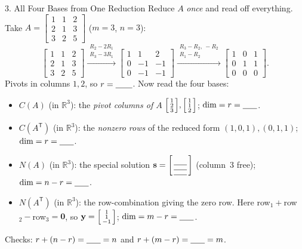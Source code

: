 \documentclass[10pt]{article}
\newcommand{\yy}{\mathbf{y}}
\newcommand{\svec}{\mathbf{s}}
\newcommand{\zero}{\mathbf{0}}
\newcommand{\T}{\mathsf{T}}
\begin{document}
\begin{notesbox}{3. All Four Bases from One Reduction}
Reduce $A$ \emph{once} and read off everything. Take
$A=\begin{bmatrix} 1 & 1 & 2 \\ 2 & 1 & 3 \\ 3 & 2 & 5 \end{bmatrix}$ ($m=3$, $n=3$):
\[
  \begin{bmatrix} 1 & 1 & 2 \\ 2 & 1 & 3 \\ 3 & 2 & 5 \end{bmatrix}
  \xrightarrow{\substack{R_2-2R_1\\ R_3-3R_1}}
  \begin{bmatrix} 1 & 1 & 2 \\ 0 & -1 & -1 \\ 0 & -1 & -1 \end{bmatrix}
  \xrightarrow{\substack{R_3-R_2,\ -R_2\\ R_1-R_2}}
  \begin{bmatrix} 1 & 0 & 1 \\ 0 & 1 & 1 \\ 0 & 0 & 0 \end{bmatrix}.
\]
Pivots in columns $1,2$, so $r=\blank{0.7cm}$. Now read the four bases:
\begin{itemize}\setlength{\itemsep}{2pt}
  \item \textbf{$C(A)$} (in $\mathbb{R}^3$): the \emph{pivot columns of $A$} $\begin{bsmallmatrix} 1\\2\\3 \end{bsmallmatrix},\begin{bsmallmatrix} 1\\1\\2 \end{bsmallmatrix}$; $\dim=r=\blank{0.6cm}$.
  \item \textbf{$C(A^{\T})$} (in $\mathbb{R}^3$): the \emph{nonzero rows} of the reduced form $(1,0,1),(0,1,1)$; $\dim=r=\blank{0.6cm}$.
  \item \textbf{$N(A)$} (in $\mathbb{R}^3$): the special solution $\svec=\begin{bsmallmatrix}\rule{0pt}{1.0em}\blank{0.55cm}\\ \blank{0.55cm}\\ \blank{0.55cm}\end{bsmallmatrix}$ (column~3 free); $\dim=n-r=\blank{0.6cm}$.
  \item \textbf{$N(A^{\T})$} (in $\mathbb{R}^3$): the row-combination giving the zero row. Here row${}_1+{}$row${}_2-{}$row${}_3=\zero$, so $\yy=\begin{bsmallmatrix} 1\\1\\-1 \end{bsmallmatrix}$; $\dim=m-r=\blank{0.6cm}$.
\end{itemize}
Checks: $r+(n-r)=\blank{0.6cm}=n$ and $r+(m-r)=\blank{0.6cm}=m$.
\end{notesbox}
\end{document}
